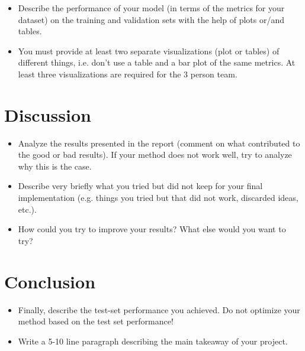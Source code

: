 \documentclass[a4, 10 pt, conference]{ieeeconf}  %
\begin{document}
{\color{blue}

\begin{itemize}
	\item Describe the performance of your model (in terms of the metrics for your dataset) on the training and validation sets with the help of plots or/and tables.
	\item You must provide at least two separate visualizations
          (plot or tables) of different things, i.e. don’t use a table
          and a bar plot of the same metrics. At least three
           visualizations are required for the 3 person team.
\end{itemize}
}

\section{Discussion}
\label{sec:discuss}

{\color{blue}
\begin{itemize}
	\item Analyze the results presented in the report (comment on what contributed to the good or bad results). If your method does not work well, try to analyze why this is the case.
	\item Describe very briefly what you tried but did not keep for your final implementation (e.g. things you tried but that did not work, discarded ideas, etc.).
	\item How could you try to improve your results? What else would you want to try?

\end{itemize}
}

\section{Conclusion}
\label{sec:con}

{\color{blue}

  \begin{itemize}
  \item Finally, describe the test-set performance you achieved. Do not
    optimize your method based on the test set performance!
  \item Write a 5-10 line paragraph describing the main takeaway of your project.
  \end{itemize}

}

\end{document}
